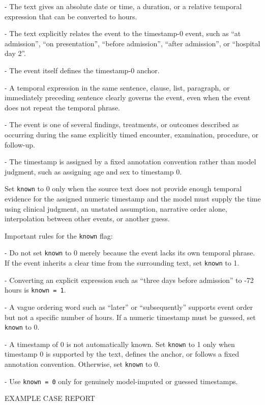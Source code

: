 \begin{tcolorbox}
- The text gives an absolute date or time, a duration, or a relative temporal expression that can be converted to hours.

- The text explicitly relates the event to the timestamp-0 event, such as ``at admission'', ``on presentation'', ``before admission'', ``after admission'', or ``hospital day 2''.

- The event itself defines the timestamp-0 anchor.

- A temporal expression in the same sentence, clause, list, paragraph, or immediately preceding sentence clearly governs the event, even when the event does not repeat the temporal phrase.

- The event is one of several findings, treatments, or outcomes described as occurring during the same explicitly timed encounter, examination, procedure, or follow-up.

- The timestamp is assigned by a fixed annotation convention rather than model judgment, such as assigning age and sex to timestamp 0.

Set \texttt{known} to 0 only when the source text does not provide enough temporal evidence for the assigned numeric timestamp and the model must supply the time using clinical judgment, an unstated assumption, narrative order alone, interpolation between other events, or another guess.

Important rules for the \texttt{known} flag:

- Do not set \texttt{known} to 0 merely because the event lacks its own temporal phrase. If the event inherits a clear time from the surrounding text, set \texttt{known} to 1.

- Converting an explicit expression such as ``three days before admission'' to -72 hours is \texttt{known = 1}.

- A vague ordering word such as ``later'' or ``subsequently'' supports event order but not a specific number of hours. If a numeric timestamp must be guessed, set \texttt{known} to 0.

- A timestamp of 0 is not automatically known. Set \texttt{known} to 1 only when timestamp 0 is supported by the text, defines the anchor, or follows a fixed annotation convention. Otherwise, set \texttt{known} to 0.

- Use \texttt{known = 0} only for genuinely model-imputed or guessed timestamps.

\vspace{1em}
EXAMPLE CASE REPORT\\
\vspace{0.2em}


\end{tcolorbox}
